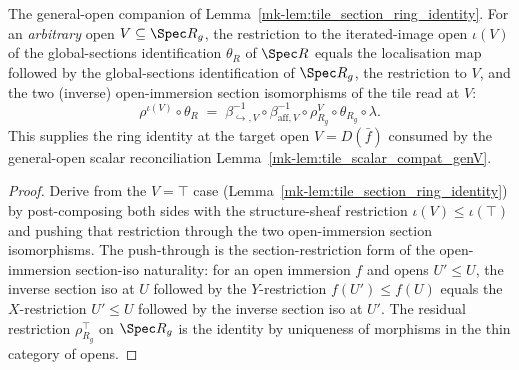 \begin{lemma}
  \label{mk-lem:tile_section_ring_identity_genV}

  The general-open companion of Lemma~\ref{mk-lem:tile_section_ring_identity}. For an \emph{arbitrary}
  open \(V \subseteq \Spec R_g\), the restriction to the iterated-image open \(\iota(V)\) of the
  global-sections identification \(\theta_R\) of \(\Spec R\) equals the localisation map followed by the
  global-sections identification of \(\Spec R_g\), the restriction to \(V\), and the two (inverse)
  open-immersion section isomorphisms of the tile read at \(V\):
  \[
    \rho^{\iota(V)} \circ \theta_R
    \;=\;
    \beta_{\hookrightarrow,V}^{-1} \circ \beta_{\mathrm{aff},V}^{-1} \circ \rho^{V}_{R_g} \circ \theta_{R_g} \circ \lambda.
  \]
  This supplies the ring identity at the target open \(V = D(\bar f)\) consumed by the general-open
  scalar reconciliation Lemma~\ref{mk-lem:tile_scalar_compat_genV}.
\end{lemma}
\begin{proof}
  Derive from the \(V = \top\) case (Lemma~\ref{mk-lem:tile_section_ring_identity}) by post-composing both
  sides with the structure-sheaf restriction \(\iota(V) \le \iota(\top)\) and pushing that restriction
  through the two open-immersion section isomorphisms. The push-through is the section-restriction form
  of the open-immersion section-iso naturality: for an open immersion \(f\) and opens \(U' \le U\), the
  inverse section iso at \(U\) followed by the \(Y\)-restriction \(f(U') \le f(U)\) equals the
  \(X\)-restriction \(U' \le U\) followed by the inverse section iso at \(U'\). The residual restriction
  \(\rho^{\top}_{R_g}\) on \(\Spec R_g\) is the identity by
  uniqueness of morphisms in the thin category of opens.
\end{proof}

